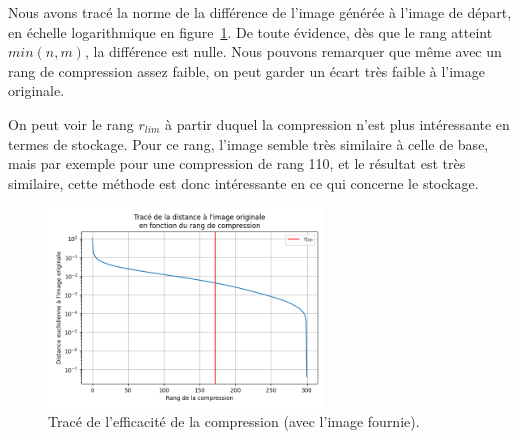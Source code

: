 Nous avons tracé la norme de la différence de l'image générée à l'image de départ, en échelle logarithmique en figure~\ref{fig:p4-dist}. De toute évidence, dès que le rang atteint $min(n, m)$,
la différence est nulle.
Nous pouvons remarquer que même avec un rang de compression assez faible, on peut garder un écart très faible à l'image originale.

On peut voir le rang $r_{lim}$ à partir duquel la compression n'est plus intéressante en termes de stockage. Pour ce rang, l'image semble très similaire à celle de base,
mais par exemple pour une compression de rang 110, et le résultat est très similaire, cette méthode est donc intéressante en ce qui concerne le stockage.

\begin{figure}[htbp]
	\centering
	\includegraphics[width=0.65\textwidth]{res/part-4-dist.png}
	\caption{Tracé de l'efficacité de la compression (avec l'image fournie).} 
	\label{fig:p4-dist}
\end{figure}
